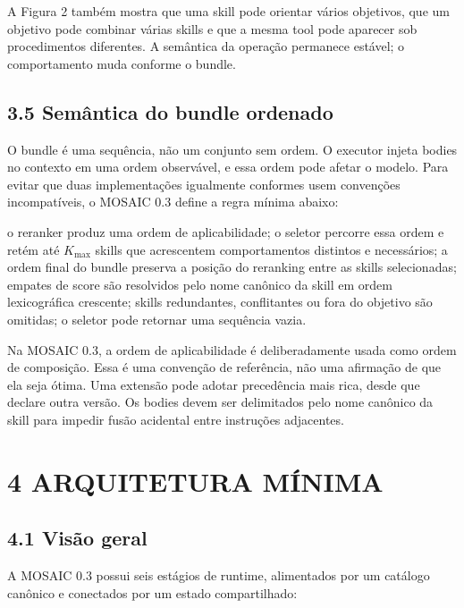 \documentclass[12pt,a4paper]{article}
\begin{document}

A Figura 2 também mostra que uma skill pode orientar vários objetivos, que um objetivo pode combinar várias skills e que a mesma tool pode aparecer sob procedimentos diferentes. A semântica da operação permanece estável; o comportamento muda conforme o bundle.


\subsection*{3.5 Semântica do bundle ordenado}

O bundle é uma sequência, não um conjunto sem ordem. O executor injeta bodies no contexto em uma ordem observável, e essa ordem pode afetar o modelo. Para evitar que duas implementações igualmente conformes usem convenções incompatíveis, o MOSAIC 0.3 define a regra mínima abaixo:


\noindent \textbullet{} o reranker produz uma ordem de aplicabilidade; \textbullet{} o seletor percorre essa ordem e retém até \(K_{\max}\) skills que acrescentem comportamentos distintos e necessários; \textbullet{} a ordem final do bundle preserva a posição do reranking entre as skills selecionadas; \textbullet{} empates de score são resolvidos pelo nome canônico da skill em ordem lexicográfica crescente; \textbullet{} skills redundantes, conflitantes ou fora do objetivo são omitidas; \textbullet{} o seletor pode retornar uma sequência vazia.\par

Na MOSAIC 0.3, a ordem de aplicabilidade é deliberadamente usada como ordem de composição. Essa é uma convenção de referência, não uma afirmação de que ela seja ótima. Uma extensão pode adotar precedência mais rica, desde que declare outra versão. Os bodies devem ser delimitados pelo nome canônico da skill para impedir fusão acidental entre instruções adjacentes.


\section*{4 ARQUITETURA MÍNIMA}

\subsection*{4.1 Visão geral}

A MOSAIC 0.3 possui seis estágios de runtime, alimentados por um catálogo canônico e conectados por um estado compartilhado:
\end{document}
